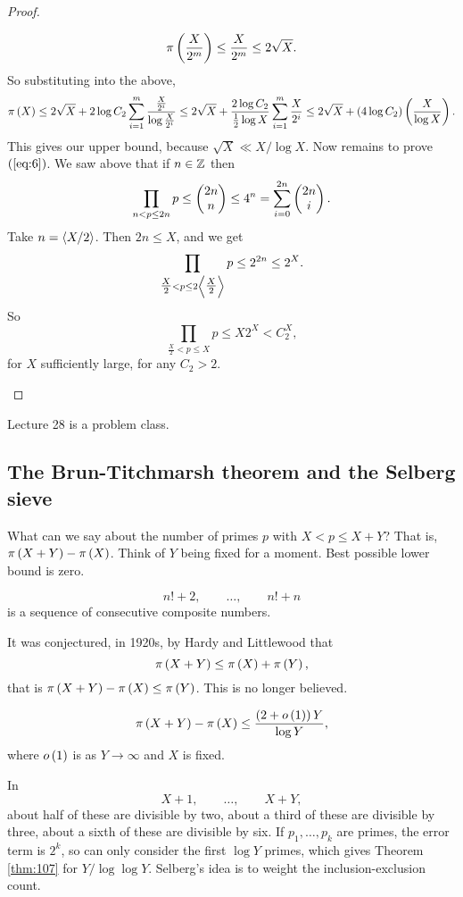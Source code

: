 \begin{proof}
\begin{itemize}
$$ \pi\left( \dfrac{X}{2^m} \right) \le \dfrac{X}{2^m} \le 2\sqrt{X}. $$
So substituting into the above,
$$ \pi\left( X \right) \le 2\sqrt{X} + 2\log C_2\sum_{i = 1}^m \dfrac{\tfrac{X}{2^i}}{\log \tfrac{X}{2^i}} \le 2\sqrt{X} + \dfrac{2\log C_2}{\tfrac{1}{2}\log X}\sum_{i = 1}^m \dfrac{X}{2^i} \le 2\sqrt{X} + \left( 4\log C_2 \right)\left( \dfrac{X}{\log X} \right). $$
This gives our upper bound, because $ \sqrt{X} \ll X / \log X $. Now remains to prove $ \left( \ref{eq:6} \right) $. We saw above that if $ n \in \mathbb{Z} $ then
$$ \prod_{n < p \le 2n} p \le \begin{pmatrix} 2n \\ n \end{pmatrix} \le 4^n = \sum_{i = 0}^{2n} \begin{pmatrix} 2n \\ i \end{pmatrix}. $$
Take $ n = \left\langle X / 2 \right\rangle $. Then $ 2n \le X $, and we get
$$ \prod_{\tfrac{X}{2} < p \le 2\left\langle \tfrac{X}{2} \right\rangle} p \le 2^{2n} \le 2^X. $$
So
$$ \prod_{\tfrac{X}{2} < p \le X} p \le X2^X < C_2^X, $$
for $ X $ sufficiently large, for any $ C_2 > 2 $.
\end{itemize}
\end{proof}


Lecture 28 is a problem class.


\subsection{The Brun-Titchmarsh theorem and the Selberg sieve}

What can we say about the number of primes $ p $ with $ X < p \le X + Y $? That is, $ \pi\left( X + Y \right) - \pi\left( X \right) $. Think of $ Y $ being fixed for a moment. Best possible lower bound is zero.

\begin{example2}
$$ n! + 2, \qquad \dots, \qquad n! + n $$
is a sequence of consecutive composite numbers.
\end{example2}

It was conjectured, in 1920s, by Hardy and Littlewood that
$$ \pi\left( X + Y \right) \le \pi\left( X \right) + \pi\left( Y \right), $$
that is $ \pi\left( X + Y \right) - \pi\left( X \right) \le \pi\left( Y \right) $. This is no longer believed.

\begin{theorem}
\label{thm:107}
$$ \pi\left( X + Y \right) - \pi\left( X \right) \le \dfrac{\left( 2 + o\left( 1 \right) \right)Y}{\log Y}, $$
where $ o\left( 1 \right) $ is as $ Y \to \infty $ and $ X $ is fixed.
\end{theorem}

In
$$ X + 1, \qquad \dots, \qquad X + Y, $$
about half of these are divisible by two, about a third of these are divisible by three, about a sixth of these are divisible by six. If $ p_1, \dots, p_k $ are primes, the error term is $ 2^k $, so can only consider the first $ \log Y $ primes, which gives Theorem \ref{thm:107} for $ Y / \log \log Y $. Selberg's idea is to weight the inclusion-exclusion count.

